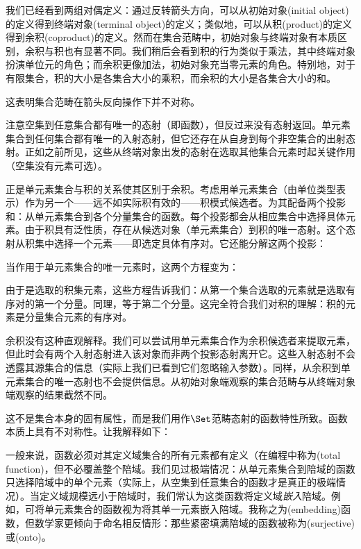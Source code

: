 我们已经看到两组对偶定义：通过反转箭头方向，可以从初始对象(initial object)的定义得到终端对象(terminal object)的定义；类似地，可以从积(product)的定义得到余积(coproduct)的定义。然而在集合范畴中，初始对象与终端对象有本质区别，余积与积也有显著不同。我们稍后会看到积的行为类似于乘法，其中终端对象扮演单位元的角色；而余积更像加法，初始对象充当零元素的角色。特别地，对于有限集合，积的大小是各集合大小的乘积，而余积的大小是各集合大小的和。

这表明集合范畴在箭头反向操作下并不对称。

注意空集到任意集合都有唯一的态射（即函数），但反过来没有态射返回。单元素集合到任何集合都有唯一的入射态射，但它还存在从自身到每个非空集合的出射态射。正如之前所见，这些从终端对象出发的态射在选取其他集合元素时起关键作用（空集没有元素可选）。

正是单元素集合与积的关系使其区别于余积。考虑用单元素集合（由单位类型\code{()}表示）作为另一个——远不如实际积有效的——积模式候选者。为其配备两个投影和：从单元素集合到各个分量集合的函数。每个投影都会从相应集合中选择具体元素。由于积具有泛性质，存在从候选对象（单元素集合）到积的唯一态射。这个态射从积集中选择一个元素——即选定具体有序对。它还能分解这两个投影：

当作用于单元素集合的唯一元素\code{()}时，这两个方程变为：

由于是选取的积集元素，这些方程告诉我们：从第一个集合选取的元素就是选取有序对的第一个分量。同理，等于第二个分量。这完全符合我们对积的理解：积的元素是分量集合元素的有序对。

余积没有这种直观解释。我们可以尝试用单元素集合作为余积候选者来提取元素，但此时会有两个入射态射进入该对象而非两个投影态射离开它。这些入射态射不会透露其源集合的信息（实际上我们已看到它们忽略输入参数）。同样，从余积到单元素集合的唯一态射也不会提供信息。从初始对象端观察的集合范畴与从终端对象端观察的结果截然不同。

这不是集合本身的固有属性，而是我们用作$\Set$范畴态射的函数特性所致。函数本质上具有不对称性。让我解释如下：

一般来说，函数必须对其定义域集合的所有元素都有定义（在编程中称为(total function)，但不必覆盖整个陪域。我们见过极端情况：从单元素集合到陪域的函数只选择陪域中的单个元素（实际上，从空集到任意集合的函数才是真正的极端情况）。当定义域规模远小于陪域时，我们常认为这类函数将定义域\emph{嵌入}陪域。例如，可将单元素集合的函数视为将其单一元素嵌入陪域。我称之为(embedding)函数，但数学家更倾向于命名相反情形：那些紧密填满陪域的函数被称为(surjective)或(onto)。

